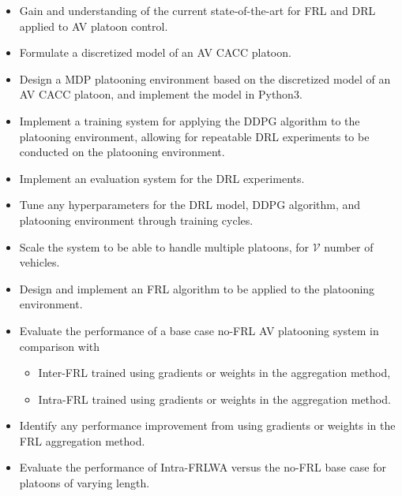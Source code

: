 \begin{itemize}
    \onehalfspacing
    \item Gain and understanding of the current state-of-the-art for FRL and DRL
    applied to AV platoon control.
    \item Formulate a discretized model of an AV CACC platoon.
    \item Design a MDP platooning environment based on the discretized model of an AV
    CACC platoon, and implement the model in Python3.
    \item Implement a training system for applying the DDPG algorithm to the platooning
    environment, allowing for repeatable DRL experiments to be conducted on the platooning environment.
    \item Implement an evaluation system for the DRL experiments.
    \item Tune any hyperparameters for the DRL model, DDPG algorithm, and platooning environment
    through training cycles.
    \item Scale the system to be able to handle multiple platoons, for $\mathcal{V}$ number of
    vehicles.
    \item Design and implement an FRL algorithm to be applied to the platooning
    environment.
    \item Evaluate the performance of a base case no-FRL AV platooning system in
    comparison with
        \begin{itemize}
            \item Inter-FRL trained using gradients or weights in the aggregation method,
            \item Intra-FRL trained using gradients or weights in the aggregation method.
        \end{itemize}
    \item Identify any performance improvement from using gradients or weights in the
    FRL aggregation method.
    \item Evaluate the performance of Intra-FRLWA versus the no-FRL base case for
    platoons of varying length.
\end{itemize}

